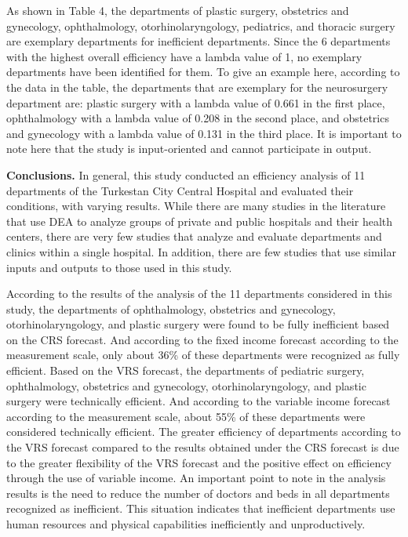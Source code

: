 \begin{multicols}{2}
As shown in Table 4, the departments of plastic surgery, obstetrics and
gynecology, ophthalmology, otorhinolaryngology, pediatrics, and thoracic
surgery are exemplary departments for inefficient departments. Since the
6 departments with the highest overall efficiency have a lambda value of
1, no exemplary departments have been identified for them. To give an
example here, according to the data in the table, the departments that
are exemplary for the neurosurgery department are: plastic surgery with
a lambda value of 0.661 in the first place, ophthalmology with a lambda
value of 0.208 in the second place, and obstetrics and gynecology with a
lambda value of 0.131 in the third place. It is important to note here
that the study is input-oriented and cannot participate in output.

{\bfseries Conclusions.} In general, this study conducted an efficiency
analysis of 11 departments of the Turkestan City Central Hospital and
evaluated their conditions, with varying results. While there are many
studies in the literature that use DEA to analyze groups of private and
public hospitals and their health centers, there are very few studies
that analyze and evaluate departments and clinics within a single
hospital. In addition, there are few studies that use similar inputs and
outputs to those used in this study.

According to the results of the analysis of the 11 departments
considered in this study, the departments of ophthalmology, obstetrics
and gynecology, otorhinolaryngology, and plastic surgery were found to
be fully inefficient based on the CRS forecast. And according to the
fixed income forecast according to the measurement scale, only about
36\% of these departments were recognized as fully efficient. Based on
the VRS forecast, the departments of pediatric surgery, ophthalmology,
obstetrics and gynecology, otorhinolaryngology, and plastic surgery were
technically efficient. And according to the variable income forecast
according to the measurement scale, about 55\% of these departments were
considered technically efficient. The greater efficiency of departments
according to the VRS forecast compared to the results obtained under the
CRS forecast is due to the greater flexibility of the VRS forecast and
the positive effect on efficiency through the use of variable income. An
important point to note in the analysis results is the need to reduce
the number of doctors and beds in all departments recognized as
inefficient. This situation indicates that inefficient departments use
human resources and physical capabilities inefficiently and
unproductively.


\end{multicols}

